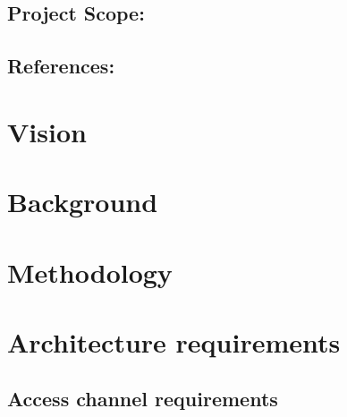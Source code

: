 \documentclass[12pt]{article}
\begin{document}
		\vspace{0.2in}
	
		\subsection{Project Scope:}
		\vspace{0.2in}		
		
		\vspace{0.2in}
	
		\subsection{References:}
		\vspace{0.1in}
			
	
	\vspace{0.5in}
	
	\newpage
	\section{Vision} %
	\vspace{0.2in}
	
	\vspace{0.5in}
	
	\newpage
	\section{Background} %
	\vspace{0.2in}
	
	\vspace{0.5in}
	
	\newpage
	\section{Methodology} %
	\vspace{0.2in}
	
	\vspace{0.5in}
	
	\newpage
	\section{Architecture requirements}
		\subsection{Access channel requirements} %
		\vspace{0.2in}
		
		\vspace{0.2in}
		
\end{document}
